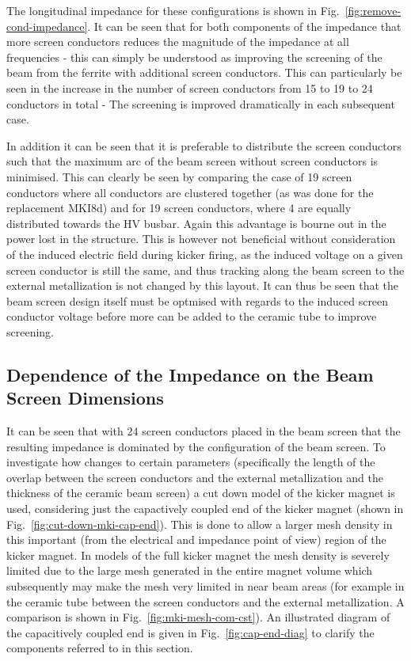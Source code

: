 The longitudinal impedance for these configurations is shown in Fig.~\ref{fig:remove-cond-impedance}. It can be seen that for both components of the impedance that more screen conductors reduces the magnitude of the impedance at all frequencies - this can simply be understood as improving the screening of the beam from the ferrite with additional screen conductors. This can particularly be seen in the increase in the number of screen conductors from 15 to 19 to 24 conductors in total - The screening is improved dramatically in each subsequent case. 

In addition it can be seen that it is preferable to distribute the screen conductors such that the maximum arc of the beam screen without screen conductors is minimised. This can clearly be seen by comparing the case of 19 screen conductors where all conductors are clustered together (as was done for the replacement MKI8d) and for 19 screen conductors, where 4 are equally distributed towards the HV busbar. Again this advantage is bourne out in the power lost in the structure. This is however not beneficial without consideration of the induced electric field during kicker firing, as the induced voltage on a given screen conductor is still the same, and thus tracking along the beam screen to the external metallization is not changed by this layout. It can thus be seen that the beam screen design itself must be optmised with regards to the induced screen conductor voltage before more can be added to the ceramic tube to improve screening.

\subsection{Dependence of the Impedance on the Beam Screen Dimensions}

It can be seen that with 24 screen conductors placed in the beam screen that the resulting impedance is dominated by the configuration of the beam screen. To investigate how changes to certain parameters (specifically the length of the overlap between the screen conductors and the external metallization and the thickness of the ceramic beam screen) a cut down model of the kicker magnet is used, considering just the capactively coupled end of the kicker magnet (shown in Fig.~\ref{fig:cut-down-mki-cap-end}). This is done to allow a larger mesh density in this important (from the electrical and impedance point of view) region of the kicker magnet. In models of the full kicker magnet the mesh density is severely limited due to the large mesh generated in the entire magnet volume which subsequently may make the mesh very limited in near beam areas (for example in the ceramic tube between the screen conductors and the external metallization. A comparison is shown in Fig.~\ref{fig:mki-mesh-com-cst}). An illustrated diagram of the capacitively coupled end is given in Fig.~\ref{fig:cap-end-diag} to clarify the components referred to in this section.

